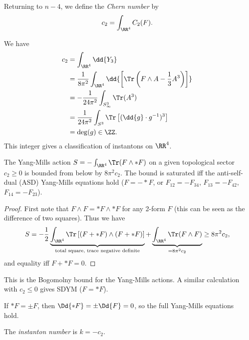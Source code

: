 \documentclass{jknotes}
\begin{document}
Returning to \(n-4\), we define the \emph{Chern number} by
\begin{equation}
    c_2 = \int_{\RR^4} C_2(F).
\end{equation}

We have
\begin{align}
    c_2 &= \int_{\RR^4} \dd{Y_3} \\
        &= \frac{1}{8\pi^2} \int_{\RR^4} \dd{\left[\Tr\left(F\wedge A - \frac{1}{3}A^3\right)\right]} \\
        &= - \frac{1}{24\pi^2} \int_{S^3_\infty} \Tr(A^3) \\
        &= \frac{1}{24\pi^2} \int_{S^3} \Tr\left[(\dd{g}\cdot g^{-1})^3\right] \\
        &= \deg(g) \in \ZZ.
\end{align}
This integer gives a classification of instantons on \(\RR^4\).

\begin{theorem}
    The Yang-Mills action \(S = -\int_{\RR^4} \Tr(F\wedge * F)\) on a given topological sector \(c_2\ge0\) is bounded from below by \(8\pi^2c_2\). The bound is saturated iff the anti-self-dual (ASD) Yang-Mills equations hold (\(F=-*F\), or \(F_{12} = -F_{34}\), \(F_{13} = -F_{42}\), \(F_{14}=-F_{23}\)).
\end{theorem}
\begin{proof}
    First note that \(F\wedge F = *F\wedge*F\) for any 2-form \(F\) (this can be seen as the difference of two squares). Thus we have
    \begin{equation}
        S = -\frac{1}{2}\underbrace{\int_{\RR^4}\Tr\left[(F+*F)\wedge(F+*F)\right]}_{\text{total square, trace negative definite}} + \underbrace{\int_{\RR^4}\Tr(F\wedge F)}_{=8\pi^2c_2} \ge 8\pi^2c_2,
    \end{equation}
    and equality iff \(F+*F=0\).
\end{proof}
This is the Bogomolny bound for the Yang-Mills actions. A similar calculation with \(c_2 \le 0\) gives SDYM (\(F=*F\)). 

If \(*F=\pm F\), then \(\Dd{*F}=\pm \Dd{F} = 0\), so the full Yang-Mills equations hold.

The \emph{instanton number} is \(k=-c_2\).
\end{document}
